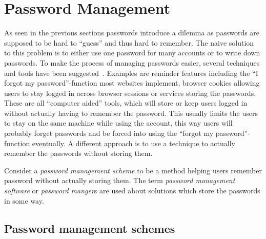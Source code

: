 \section{Password Management}
As seen in the previous sections passwords introduce a dilemma as passwords are supposed to be hard to ``guess'' and thus hard to remember. The naive solution to this problem is to either use one password for many accounts or to write down passwords. To make the process of managing passwords easier, several techniques and tools have been suggested~\cite{management-strategies}. Examples are reminder features including the ``I forgot my password''-function most websites implement, browser cookies allowing users to stay logged in across browser sessions or services storing the passwords. These are all ``computer aided'' tools, which will store or keep users logged in without actually having to remember the password. This usually limits the users to stay on the same machine while using the account, this way users will probably forget passwords and be forced into using the ``forgot my password''-function eventually. A different approach is to use a technique to actually remember the passwords without storing them.
\par Consider a \emph{password management scheme} to be a method helping users remember password without actually storing them. The term \emph{password management software} or \emph{password manger}s are used about solutions which store the passwords in some way.

\subsection{Password management schemes}
 
